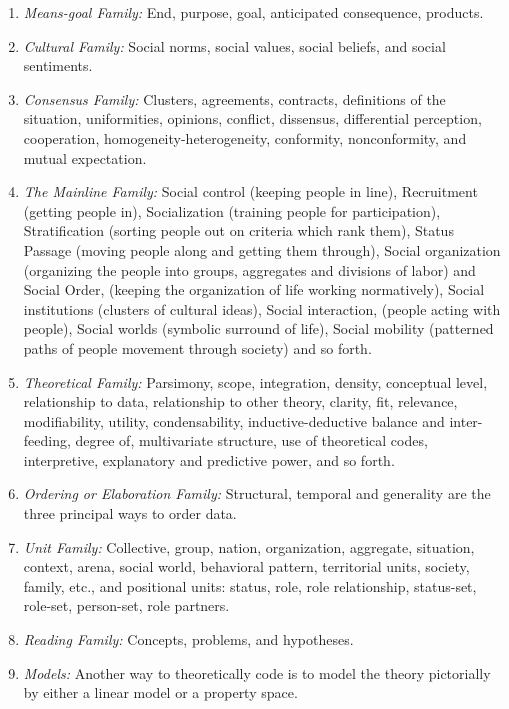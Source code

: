 \begin{enumerate}
\item \textit{Means-goal Family:} End, purpose, goal, anticipated consequence, products.
\item \textit{Cultural Family:} Social norms, social values, social beliefs, and social sentiments.
\item \textit{Consensus Family:} Clusters, agreements, contracts, definitions of the situation, uniformities, opinions, conflict, dissensus, differential perception, cooperation, homogeneity-heterogeneity, conformity, nonconformity, and mutual expectation.
\item \textit{The Mainline Family:} Social control (keeping people in line), Recruitment (getting people in), Socialization (training people for participation), Stratification (sorting people out on criteria which rank them), Status Passage (moving people along and getting them through), Social organization (organizing the people into groups, aggregates and divisions of labor) and Social Order, (keeping the organization of life working normatively), Social institutions (clusters of cultural ideas), Social interaction, (people acting with people), Social worlds (symbolic surround of life), Social mobility (patterned paths of people movement through society) and so forth.
\item \textit{Theoretical Family:} Parsimony, scope, integration, density, conceptual level, relationship to data, relationship to other theory, clarity, fit, relevance, modifiability, utility, condensability, inductive-deductive balance and inter- feeding, degree of, multivariate structure, use of theoretical codes, interpretive, explanatory and predictive power, and so forth.
\item \textit{Ordering or Elaboration Family:} Structural, temporal and generality are the three principal ways to order data.
\item \textit{Unit Family:} Collective, group, nation, organization, aggregate, situation, context, arena, social world, behavioral pattern, territorial units, society, family, etc., and positional units: status, role, role relationship, status-set, role-set, person-set, role partners. 
\item \textit{Reading Family:} Concepts, problems, and hypotheses. 
\item \textit{Models:} Another way to theoretically code is to model the theory pictorially by either a linear model or a property space. \cite{GlaserTheoreticalSensitivity}
\end{enumerate}

